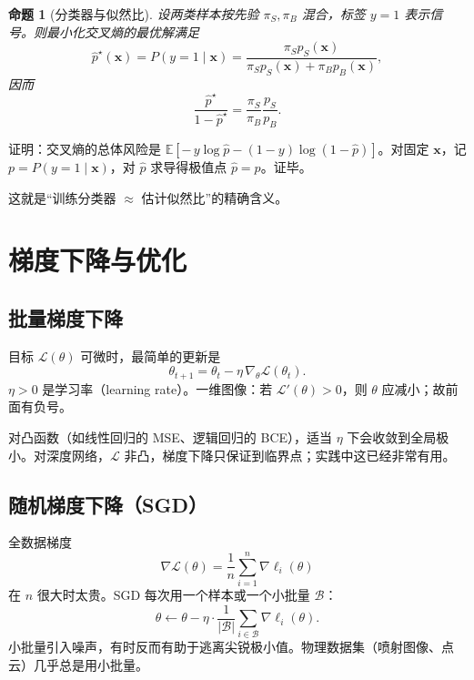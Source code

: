 \documentclass[11pt,a4paper]{article}
\theoremstyle{definition}
\theoremstyle{plain}
\newtheorem{proposition}{命题}[section]
\theoremstyle{remark}
\newcommand{\E}{\mathbb{E}}
\newcommand{\loss}{\mathcal{L}}
\begin{document}
\begin{proposition}[分类器与似然比]
\label{sec:lr}
设两类样本按先验 $\pi_S,\pi_B$ 混合，标签 $y=1$ 表示信号。则最小化交叉熵的最优解满足
\begin{equation}
  \hat p^\star(\mathbf{x})=P(y=1\mid\mathbf{x})=\frac{\pi_S p_S(\mathbf{x})}{\pi_S p_S(\mathbf{x})+\pi_B p_B(\mathbf{x})},
\end{equation}
因而
\begin{equation}
  \frac{\hat p^\star}{1-\hat p^\star}=\frac{\pi_S}{\pi_B}\frac{p_S}{p_B}.
\end{equation}
\end{proposition}
证明：交叉熵的总体风险是 $\E[-\,y\log\hat p-(1-y)\log(1-\hat p)]$。对固定 $\mathbf{x}$，记 $p=P(y=1\mid\mathbf{x})$，对 $\hat p$ 求导得极值点 $\hat p=p$。证毕。

这就是``训练分类器 $\approx$ 估计似然比''的精确含义。

\section{梯度下降与优化}
\label{sec:gd}

\subsection{批量梯度下降}

目标 $\loss(\theta)$ 可微时，最简单的更新是
\begin{equation}
\label{eq:gd}
  \theta_{t+1}=\theta_t-\eta\,\nabla_\theta\loss(\theta_t).
\end{equation}
$\eta>0$ 是学习率（learning rate）。一维图像：若 $\loss'(\theta)>0$，则 $\theta$ 应减小；故前面有负号。

对凸函数（如线性回归的 MSE、逻辑回归的 BCE），适当 $\eta$ 下会收敛到全局极小。对深度网络，$\loss$ 非凸，梯度下降只保证到临界点；实践中这已经非常有用。

\subsection{随机梯度下降（SGD）}

全数据梯度
\begin{equation}
  \nabla\loss(\theta)=\frac{1}{n}\sum_{i=1}^n \nabla\ell_i(\theta)
\end{equation}
在 $n$ 很大时太贵。SGD 每次用一个样本或一个小批量 $\mathcal{B}$：
\begin{equation}
  \theta\leftarrow\theta-\eta\cdot\frac{1}{|\mathcal{B}|}\sum_{i\in\mathcal{B}}\nabla\ell_i(\theta).
\end{equation}
小批量引入噪声，有时反而有助于逃离尖锐极小值。物理数据集（喷射图像、点云）几乎总是用小批量。
\end{document}
